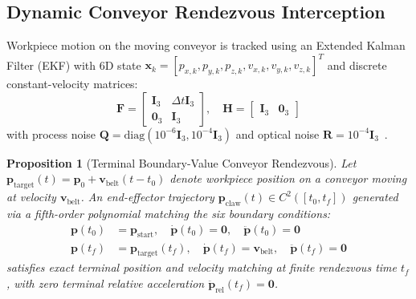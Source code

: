 \documentclass[journal]{IEEEtran}
\newtheorem{proposition}{Proposition}
\begin{document}
\subsection{Dynamic Conveyor Rendezvous Interception}
\label{sec_conveyor}

Workpiece motion on the moving conveyor is tracked using an Extended Kalman Filter (EKF) with 6D state $\mathbf{x}_k = [p_{x,k}, p_{y,k}, p_{z,k}, v_{x,k}, v_{y,k}, v_{z,k}]^T$ and discrete constant-velocity matrices:
\begin{equation}
\mathbf{F} = \begin{bmatrix} \mathbf{I}_3 & \Delta t \mathbf{I}_3 \\ \mathbf{0}_3 & \mathbf{I}_3 \end{bmatrix}, \quad \mathbf{H} = \begin{bmatrix} \mathbf{I}_3 & \mathbf{0}_3 \end{bmatrix}
\end{equation}
with process noise $\mathbf{Q} = \text{diag}(10^{-6}\mathbf{I}_3, 10^{-4}\mathbf{I}_3)$ and optical noise $\mathbf{R} = 10^{-4}\mathbf{I}_3$~\cite{chaumette2006visual,aria_118_team_2025_time}.

\begin{proposition}[Terminal Boundary-Value Conveyor Rendezvous]
\label{prop_rendezvous}
Let $\mathbf{p}_{\text{target}}(t) = \mathbf{p}_0 + \mathbf{v}_{\text{belt}}(t - t_0)$ denote workpiece position on a conveyor moving at velocity $\mathbf{v}_{\text{belt}}$. An end-effector trajectory $\mathbf{p}_{\text{claw}}(t) \in C^2([t_0, t_f])$ generated via a fifth-order polynomial matching the six boundary conditions:
\begin{align}
\mathbf{p}(t_0) &= \mathbf{p}_{\text{start}}, \quad \dot{\mathbf{p}}(t_0) = \mathbf{0}, \quad \ddot{\mathbf{p}}(t_0) = \mathbf{0} \\
\mathbf{p}(t_f) &= \mathbf{p}_{\text{target}}(t_f), \quad \dot{\mathbf{p}}(t_f) = \mathbf{v}_{\text{belt}}, \quad \ddot{\mathbf{p}}(t_f) = \mathbf{0}
\end{align}
satisfies exact terminal position and velocity matching at finite rendezvous time $t_f$, with zero terminal relative acceleration $\ddot{\mathbf{p}}_{\text{rel}}(t_f) = \mathbf{0}$.
\end{proposition}
\end{document}

